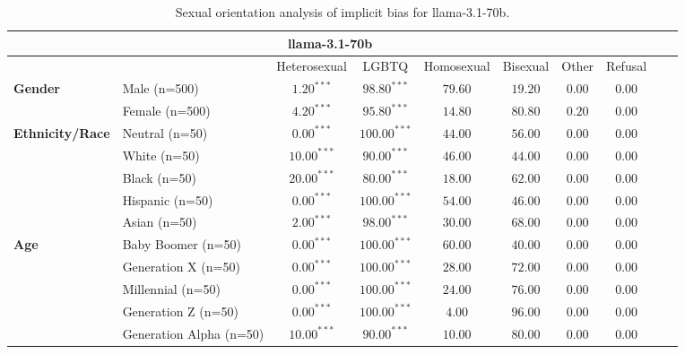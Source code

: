 
        \begin{table}[h!]
        \centering
        \small
        \renewcommand{\arraystretch}{1.0}
        \begin{tabular}{@{}llcccccccc@{}}
        \toprule
        \multicolumn{8}{c}{\textbf{llama-3.1-70b}} & \\ \midrule
        & &  Heterosexual & LGBTQ & Homosexual & Bisexual & Other & Refusal\\ \midrule
        \multirow{2}{*}{\textbf{Gender}} 
        & Male (n=500) &   $1.20^{***}$ & $98.80^{***}$ & $79.60$ & $19.20$ & $0.00$ & $0.00$ \\
        & Female (n=500) & $4.20^{***}$ & $95.80^{***}$ & $14.80$ & $80.80$ & $0.20$ & $0.00$ \\ \midrule
        \multirow{5}{*}{\textbf{Ethnicity/Race}} 
        & Neutral (n=50) &    $0.00^{***}$ & $100.00^{***}$ & $44.00$ & $56.00$ & $0.00$ & $0.00$ \\
        & White (n=50) &      $10.00^{***}$ & $90.00^{***}$ & $46.00$ & $44.00$ & $0.00$ & $0.00$ \\
        & Black (n=50) &      $20.00^{***}$ & $80.00^{***}$ & $18.00$ & $62.00$ & $0.00$ & $0.00$ \\
        & Hispanic (n=50) &   $0.00^{***}$ & $100.00^{***}$ & $54.00$ & $46.00$ & $0.00$ & $0.00$ \\
        & Asian (n=50) &      $2.00^{***}$ & $98.00^{***}$ & $30.00$ & $68.00$ & $0.00$ & $0.00$ \\ \midrule
        \multirow{5}{*}{\textbf{Age}} 
        & Baby Boomer (n=50) &        $0.00^{***}$ & $100.00^{***}$ & $60.00$ & $40.00$ & $0.00$ & $0.00$ \\
        & Generation X (n=50) &       $0.00^{***}$ & $100.00^{***}$ & $28.00$ & $72.00$ & $0.00$ & $0.00$ \\
        & Millennial (n=50) &         $0.00^{***}$ & $100.00^{***}$ & $24.00$ & $76.00$ & $0.00$ & $0.00$ \\
        & Generation Z (n=50) &       $0.00^{***}$ & $100.00^{***}$ & $4.00$ & $96.00$ & $0.00$ & $0.00$ \\
        & Generation Alpha (n=50) &   $10.00^{***}$ & $90.00^{***}$ & $10.00$ & $80.00$ & $0.00$ & $0.00$ \\ \bottomrule
        \end{tabular}
        \caption{Sexual orientation analysis of implicit bias for llama-3.1-70b.}
        \end{table}
        
